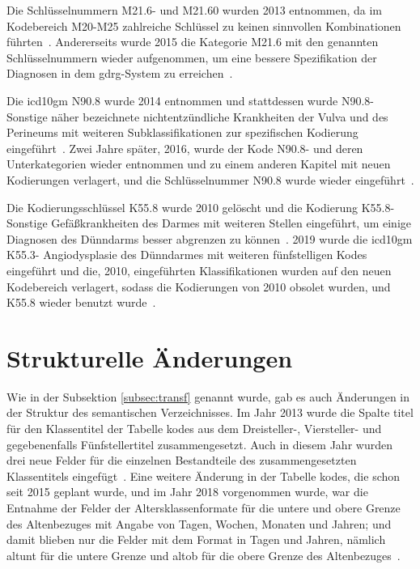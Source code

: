 Die Schlüsselnummern \textsf{M21.6-} und \textsf{M21.60} wurden 2013 entnommen, da im Kodebereich \textsf{M20-M25} zahlreiche Schlüssel zu keinen sinnvollen Kombinationen führten~\cite{dele13}. Andererseits wurde 2015 die Kategorie \textsf{M21.6} mit den genannten Schlüsselnummern wieder aufgenommen, um eine bessere Spezifikation der Diagnosen in dem \ac{gdrg}-System zu erreichen~\cite{komm15}. 

Die \ac{icd10gm} \textsf{N90.8} wurde 2014 entnommen und stattdessen wurde \textsf{N90.8-} \textsf{Sonstige näher bezeichnete nichtentzündliche Krankheiten der Vulva und des Perineums} mit weiteren Subklassifikationen zur spezifischen Kodierung eingeführt~\cite{komm14}. Zwei Jahre später, 2016, wurde der Kode \textsf{N90.8-} und deren Unterkategorien wieder entnommen und zu einem anderen Kapitel mit neuen Kodierungen verlagert, und die Schlüsselnummer \textsf{N90.8} wurde wieder eingeführt~\cite{komm16}.

Die Kodierungsschlüssel \textsf{K55.8} wurde 2010 gelöscht und die Kodierung \textsf{K55.8-} \textsf{Sonstige Gefäßkrankheiten des Darmes} mit weiteren Stellen eingeführt, um einige Diagnosen des Dünndarms besser abgrenzen zu können~\cite{komm10}. 2019 wurde die \ac{icd10gm} \textsf{K55.3-} \textsf{Angiodysplasie des Dünndarmes} mit weiteren fünfstelligen Kodes eingeführt und die, 2010, eingeführten Klassifikationen wurden auf den neuen Kodebereich verlagert, sodass die Kodierungen von 2010 obsolet wurden, und \textsf{K55.8} wieder benutzt wurde~\cite{komm19}.

\section{Strukturelle Änderungen} \label{sec:strucmodif}

Wie in der Subsektion \ref{subsec:transf} genannt wurde, gab es auch Änderungen in der Struktur des semantischen Verzeichnisses. Im Jahr 2013 wurde die Spalte \glqq\textsf{titel}\grqq{} für den Klassentitel der Tabelle \glqq\textsf{kodes}\grqq{} aus dem Dreisteller-, Viersteller- und gegebenenfalls Fünfstellertitel zusammengesetzt. Auch in diesem Jahr wurden drei neue Felder für die einzelnen Bestandteile des zusammengesetzten Klassentitels eingefügt~\cite{readme13}. Eine weitere Änderung in der Tabelle \glqq\textsf{kodes}\grqq{}, die schon seit 2015 geplant wurde, und im Jahr 2018 vorgenommen wurde, war die Entnahme der Felder der Altersklassenformate für die untere und obere Grenze des Altenbezuges mit Angabe von Tagen, Wochen, Monaten und Jahren; und damit blieben nur die Felder mit dem Format in Tagen und Jahren, nämlich  \glqq\textsf{altunt}\grqq{} für die untere Grenze und \glqq\textsf{altob}\grqq{} für die obere Grenze des Altenbezuges~\cite{readme17}.
